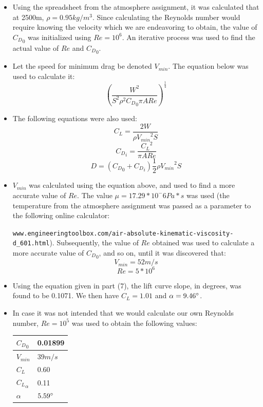 \documentclass{article}
\begin{document}
\begin{itemize}
\item{Using the spreadsheet from the atmosphere assignment, it was calculated that at 2500m, $\rho = 0.95 kg/m^3$.  Since calculating the
Reynolds number would require knowing the velocity which we are endeavoring to obtain, the value of ${C_D}_0$ was initialized using 
$Re = 10^6$.  An iterative process was used to find the actual value of $Re$ and ${C_D}_0$.}


\item{Let the speed for minimum drag be denoted $V_{min}$.  The equation below was used to calculate it:
\[ (\frac{W^2}{S^2 \rho^2 {C_D}_0 \pi AR e})^\frac{1}{4} \]}
\item{The following equations were also used:
\[C_L = \frac{2 W}{\rho {V_{min}}^2 S} \]
\[ {C_D}_i = \frac{{C_L}^2}{\pi AR e} \]
\[ D = ({C_D}_0 + {C_D}_i)\frac{1}{2} \rho {V_{min}}^2 S \]}

\item{$V_{min}$ was calculated using the equation above, and used to find a more accurate value of $Re$.  The value $\mu = 17.29*10^-6 Pa*s$
was used (the temperature from the atmosphere assignment was passed as a parameter to the following online calculator:

\verb|www.engineeringtoolbox.com/air-absolute-kinematic-viscosity-d_601.html|).  Subsequently, the value of $Re$ obtained was used to calculate a
more accurate value of ${C_D}_0$, and so on, until it was discovered that:
\[V_{min} = 52 m/s\]
\[Re = 5*10^6\]}

\item{Using the equation given in part (7), the lift curve slope, in degrees, was found to be 0.1071.  We then have $C_L = 1.01$ and $\alpha =
9.46\degree$.}

\item{In case it was not intended that we would calculate our own Reynolds number, $Re = 10^5$ was used to obtain the following values:}

\begin{tabular}{l | l}
\hline
${C_D}_0$ & 0.01899\\ \hline
$V_{min}$ & $39 m/s$\\ \hline
$C_L$ & 0.60\\ \hline
${C_L}_\alpha$ & 0.11\\ \hline
$\alpha$ & $5.59\degree$\\ \hline
\end{tabular}

\end{itemize}
\end{document}
